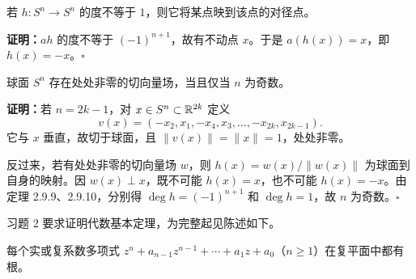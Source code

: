 若 $h:S^n\to S^n$ 的度不等于 $1$，则它将某点映到该点的对径点。

\noindent\textbf{证明：}$ah$ 的度不等于 $(-1)^{n+1}$，故有不动点 $x$。于是 $a(h(x))=x$，即 $h(x)=-x$。\hfill$\square$

球面 $S^n$ 存在处处非零的切向量场，当且仅当 $n$ 为奇数。

\noindent\textbf{证明：}若 $n=2k-1$，对 $x\in S^n\subset\mathbb{R}^{2k}$ 定义
\[
v(x)=(-x_2,x_1,-x_4,x_3,\ldots,-x_{2k},x_{2k-1}).
\]
它与 $x$ 垂直，故切于球面，且 $\|v(x)\|=\|x\|=1$，处处非零。

反过来，若有处处非零的切向量场 $w$，则 $h(x)=w(x)/\|w(x)\|$ 为球面到自身的映射。因 $w(x)\perp x$，既不可能 $h(x)=x$，也不可能 $h(x)=-x$。由定理 2.9.9、2.9.10，分别得 $\deg h=(-1)^{n+1}$ 和 $\deg h=1$，故 $n$ 为奇数。\hfill$\square$

习题 2 要求证明代数基本定理，为完整起见陈述如下。

每个实或复系数多项式 $z^n+a_{n-1}z^{n-1}+\cdots+a_1z+a_0$（$n\geq1$）在复平面中都有根。

